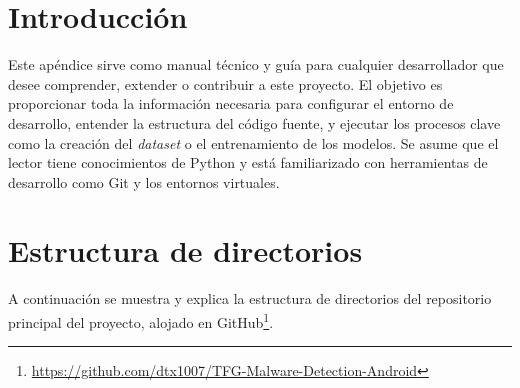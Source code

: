 \label{apendice:documentacion_tecnica}

\section{Introducción}
Este apéndice sirve como manual técnico y guía para cualquier desarrollador que desee comprender, extender o contribuir a este proyecto. El objetivo es proporcionar toda la información necesaria para configurar el entorno de desarrollo, entender la estructura del código fuente, y ejecutar los procesos clave como la creación del \textit{dataset} o el entrenamiento de los modelos. Se asume que el lector tiene conocimientos de Python y está familiarizado con herramientas de desarrollo como Git y los entornos virtuales.

\section{Estructura de directorios}
A continuación se muestra y explica la estructura de directorios del repositorio principal del proyecto, alojado en GitHub\footnote{\url{https://github.com/dtx1007/TFG-Malware-Detection-Android}}.


\newpage

